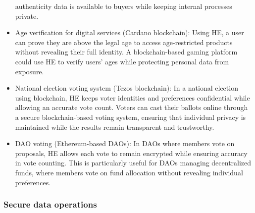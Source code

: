 \documentclass[
  letterpaper,
  DIV=11,
  numbers=noendperiod,
  oneside]{scrartcl}
\begin{document}
\begin{itemize}
  authenticity data is available to buyers while keeping internal
  processes private.
\item
  Age verification for digital services (Cardano blockchain): Using HE,
  a user can prove they are above the legal age to access age-restricted
  products without revealing their full identity. A blockchain-based
  gaming platform could use HE to verify users' ages while protecting
  personal data from exposure.
\item
  National election voting system (Tezos blockchain): In a national
  election using blockchain, HE keeps voter identities and preferences
  confidential while allowing an accurate vote count. Voters can cast
  their ballots online through a secure blockchain-based voting system,
  ensuring that individual privacy is maintained while the results
  remain transparent and trustworthy.
\item
  DAO voting (Ethereum-based DAOs): In DAOs where members vote on
  proposals, HE allows each vote to remain encrypted while ensuring
  accuracy in vote counting. This is particularly useful for DAOs
  managing decentralized funds, where members vote on fund allocation
  without revealing individual preferences.
\end{itemize}

\subsubsection{Secure data operations}\label{secure-data-operations}
\end{document}
